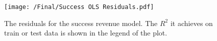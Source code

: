 \begin{multicols}{2}
            \begin{figure}[H]
                \texttt{[image: /Final/Success OLS Residuals.pdf]}
                \caption[short]{The residuals for the success revenue model. 
                                The $R^2$ it achieves on train or test data is shown in
                                the legend of the plot.}\label{fig-success-ols-residuals}

            \end{figure}

        \end{multicols}

